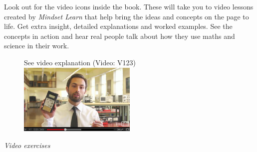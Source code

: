 {

Look out for the video icons inside the book. These will take you to video lessons created by \textit{Mindset
Learn} that help bring the ideas and concepts on the page to life. Get extra insight, detailed
explanations and worked examples. See the concepts in action and hear real people talk about how they
use maths and science in their work. \par

\begin{figure}[h]
\begin{center}
See video explanation  (Video: V123)\\
\includegraphics[width=0.5\textwidth]{title_images/veritasiumvideo.png}
\end{center}
\end{figure}

}
{\normalfont\sffamily\fontsize{22}\normalfont\itshape Video exercises} \par

